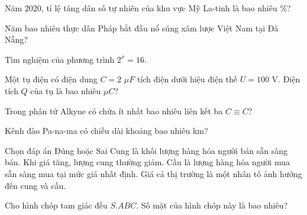 \begin{ex}
    Năm 2020, tỉ lệ tăng dân số tự nhiên của khu vực Mỹ La-tinh là bao nhiêu \%?
\end{ex}
\begin{ex}
    Năm bao nhiêu thực dân Pháp bắt đầu nổ súng xâm lược Việt Nam tại Đà Nẵng?
\end{ex}
\begin{ex}
    Tìm nghiệm của phương trình $2^x = 16$.
\end{ex}
\begin{ex}
    Một tụ điện có điện dung $C = 2$ $\mu F$ tích điện dưới hiệu điện thế $U = 100$ V. Điện tích $Q$ của tụ là bao nhiêu $\mu C$?
\end{ex}
\begin{ex}
    Trong phân tử Alkyne có chứa ít nhất bao nhiêu liên kết ba $C \equiv C$?
\end{ex}
\begin{ex}
    Kênh đào Pa-na-ma có chiều dài khoảng bao nhiêu km?
\end{ex}
\begin{ex}
    Chọn đáp án Đúng hoặc Sai
    \choiceTF
    {\True Cung là khối lượng hàng hóa người bán sẵn sàng bán.}
    {Khi giá tăng, lượng cung thường giảm.}
    {\True Cầu là lượng hàng hóa người mua sẵn sàng mua tại mức giá nhất định.}
    {\True Giá cả thị trường là một nhân tố ảnh hưởng đến cung và cầu.}
\end{ex}
\begin{ex}
    Cho hình chóp tam giác đều $S.ABC$. Số mặt của hình chóp này là bao nhiêu?
\end{ex}

